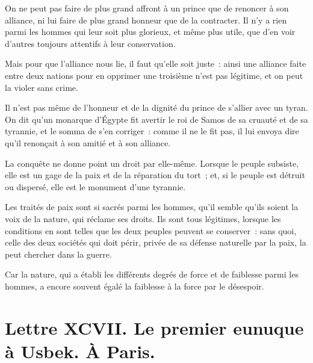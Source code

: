 \documentclass[french,twoside]{book} %
\newcommand{\dateline}[1]{\medskip{\RaggedLeft{#1}\par}\bigskip}
\begin{document}
On ne peut pas faire de plus grand affront à un prince que de renoncer à son alliance, ni lui faire de plus grand honneur que de la contracter. Il n’y a rien parmi les hommes qui leur soit plus glorieux, et même plus utile, que d’en voir d’autres toujours attentifs à leur conservation.\par
Mais pour que l’alliance nous lie, il faut qu’elle soit juste : ainsi une alliance faite entre deux nations pour en opprimer une troisième n’est pas légitime, et on peut la violer sans crime.\par
Il n’est pas même de l’honneur et de la dignité du prince de s’allier avec un tyran. On dit qu’un monarque d’Égypte fit avertir le roi de Samos de sa cruauté et de sa tyrannie, et le somma de s’en corriger : comme il ne le fit pas, il lui envoya dire qu’il renonçait à son amitié et à son alliance.\par
La conquête ne donne point un droit par elle-même. Lorsque le peuple subsiste, elle est un gage de la paix et de la réparation du tort ; et, si le peuple est détruit ou dispersé, elle est le monument d’une tyrannie.\par
Les traités de paix sont si sacrés parmi les hommes, qu’il semble qu’ils soient la voix de la nature, qui réclame ses droits. Ils sont tous légitimes, lorsque les conditions en sont telles que les deux peuples peuvent se conserver : sans quoi, celle des deux sociétés qui doit périr, privée de sa défense naturelle par la paix, la peut chercher dans la guerre.\par
Car la nature, qui a établi les différents degrés de force et de faiblesse parmi les hommes, a encore souvent égalé la faiblesse à la force par le désespoir.\par

\dateline{À Paris, le 4 de la lune de Zilhagé, 1716.}
\section[{Lettre XCVII. Le premier eunuque à Usbek. À Paris.}]{Lettre XCVII. Le premier eunuque à Usbek. À Paris.}\renewcommand{\leftmark}{Lettre XCVII. Le premier eunuque à Usbek. À Paris.}
\end{document}
